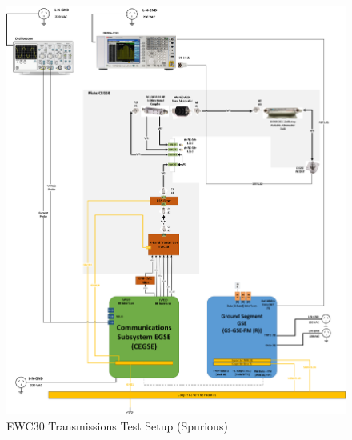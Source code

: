\begin{figure}[H]\centering
	\includegraphics[width=1\linewidth]{figuras/EWC30-PXA-Setup2.png}  
	\caption{EWC30 Transmissions Test Setup (Spurious)}
  \label{fig:data-setup2}
\end{figure}
